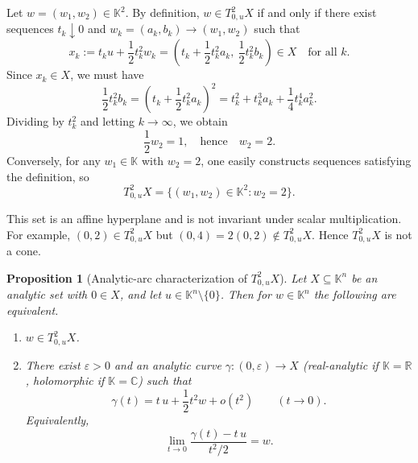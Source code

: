 \documentclass[10pt,reqno]{amsart}
\theoremstyle{break-italic}
\theoremstyle{break-italic}
\theoremstyle{break-italic}
\theoremstyle{break-italic}
\theoremstyle{break-italic}
\theoremstyle{break-italic}
\theoremstyle{break-italic}
\theoremstyle{break-italic}
\newtheorem{Proposition}[satz]{Proposition}
\theoremstyle{break-roman}
\theoremstyle{standard}
\theoremstyle{varthm-roman}
\theoremstyle{varthm-italic}
\theoremstyle{varthm-roman-break}
\theoremstyle{varthm-italic-break}
\theoremstyle{varthm-roman-no-punctuation}
\theoremstyle{varthm-italic-no-punctuation}
\numberwithin{equation}{section}
\begin{document}
Let $w=(w_1,w_2)\in \mathbb K^2$.
By definition, $w\in T^2_{0,u}X$ if and only if there exist sequences
$t_k\downarrow 0$ and $w_k=(a_k,b_k)\to (w_1,w_2)$ such that
\[
x_k:=t_k u+\frac12 t_k^2 w_k
=
\left(t_k+\frac12 t_k^2 a_k,\ \frac12 t_k^2 b_k\right)
\in X
\quad\text{for all }k.
\]
Since $x_k\in X$, we must have
\[
\frac12 t_k^2 b_k
=
\left(t_k+\frac12 t_k^2 a_k\right)^2
=
t_k^2+t_k^3 a_k+\frac14 t_k^4 a_k^2.
\]
Dividing by $t_k^2$ and letting $k\to\infty$, we obtain
\[
\frac12 w_2 = 1,
\quad\text{hence}\quad
w_2=2.
\]
Conversely, for any $w_1\in\mathbb K$ with $w_2=2$, one easily constructs sequences
satisfying the definition, so
$$
T^2_{0,u}X=\{(w_1,w_2)\in\mathbb K^2 : w_2=2\}.
$$

This set is an affine hyperplane and is not invariant under scalar multiplication.
For example, $(0,2)\in T^2_{0,u}X$ but $(0,4)=2(0,2)\notin T^2_{0,u}X$.
Hence $T^2_{0,u}X$ is not a cone.





\begin{Proposition}[Analytic-arc characterization of $T^2_{0,u}X$] \label{prop:curve-charac}
Let $X\subseteq \mathbb K^n$  be an analytic set with $0\in X$, and let
$u\in \mathbb K^n\setminus\{0\}$. 
Then for $w\in \mathbb K^n$ the following are equivalent.
\begin{enumerate}
\item[(1)] $w\in T^2_{0,u}X$.
\item[(2)] There exist $\varepsilon>0$ and an analytic curve
$\gamma:(0,\varepsilon)\to X$ (real-analytic if $\mathbb K=\mathbb R$, holomorphic if $\mathbb K=\mathbb C$)
such that
\[
\gamma(t)=t\,u+\frac12 t^2 w+o(t^2)\qquad (t\to 0).
\]
Equivalently,
\[
\lim_{t\to 0}\frac{\gamma(t)-t\,u}{t^2/2}=w.
\]
\end{enumerate}
\end{Proposition}
\end{document}
